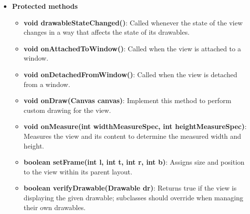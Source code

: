 \documentclass{report}
\begin{document}
\begin{itemize}
        \item \textbf{Protected methods}
            \begin{itemize}
                \item \textbf{void drawableStateChanged()}: Called whenever the state of the view changes in a way that affects the state of its drawables.
                \item \textbf{void onAttachedToWindow()}: Called when the view is attached to a window.
                \item \textbf{void onDetachedFromWindow()}: Called when the view is detached from a window.
                \item \textbf{void onDraw(Canvas canvas)}: Implement this method to perform custom drawing for the view.
                \item \textbf{void onMeasure(int widthMeasureSpec, int heightMeasureSpec)}: Measures the view and its content to determine the measured width and height.
                \item \textbf{boolean setFrame(int l, int t, int r, int b)}: Assigns size and position to the view within its parent layout.
                \item \textbf{boolean verifyDrawable(Drawable dr)}: Returns true if the view is displaying the given drawable; subclasses should override when managing their own drawables.
            \end{itemize}

    \end{itemize}

    \pagebreak 
\end{document}
